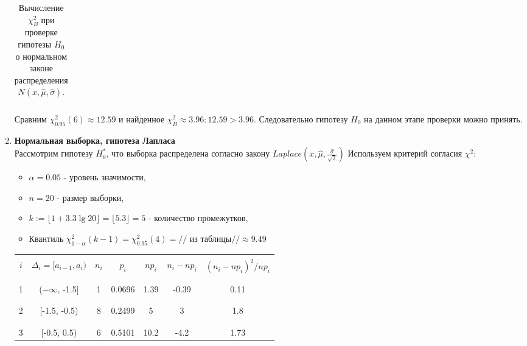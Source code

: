 \documentclass[../body.tex]{subfiles}
\begin{document}
\begin{enumerate}
\begin{table}[H]
\begin{tabular}{| c | c | c | c | c | c | c |}
			&  &  &  &  &  & \\\hline \hline
		\end{tabular}
		\caption{Вычисление $\chi_B^2$ при проверке гипотезы $H_0$ о нормальном законе распределения $N(x, \hat{\mu}, \hat{\sigma})$.}
		\label{chi2_normal}
	\end{table}
Сравним $\chi_{0.95}^2(6) \approx 12.59$ и найденное  $\chi_B^2 \approx 3.96: 12.59 > 3.96.$ Следовательно гипотезу $H_0$ на данном этапе проверки можно принять.\\
\item \textbf{Нормальная выборка, гипотеза Лапласа}\\
Рассмотрим гипотезу $H_0^*$, что выборка распределена согласно закону $Laplace(x, \hat{\mu},\frac{\hat{\sigma}}{\sqrt2} )$
Используем критерий согласия $\chi^2$:
\begin{itemize}
	\item $\alpha = 0.05$ - уровень значимости,
	\item $n = 20$ - размер выборки,
	\item $k := \lfloor1+3.3\lg 20\rfloor = \lfloor5.3\rfloor = 5$ - количество промежутков,
	\item Квантиль $\chi_{1 - \alpha}^2(k - 1) = \chi_{0.95}^2(4) = //$ из таблицы\cite[с.~358]{math}$// \approx 9.49$
\end{itemize}
\begin{table}[H]
	\centering
	\begin{tabular}{| c | c | c | c | c | c | c |}
		\hline \hline
		&  &  &  &  &  & \\
		$i$   & $\Delta_i = [a_{i-1}, a_i)$   &   $n_i$ &   $p_i$ &   $np_i$ &   $n_i - np_i$ &   $(n_i - np_i)^2/np_i$ \\
		&  &  &  &  &  & \\
		\hline
		&  &  &  &  &  & \\
		1     & ($-\infty$, -1.5]           &       1 &  0.0696 &     1.39 &          -0.39 &                    0.11 \\
		&  &  &  &  &  & \\\hline &  &  &  &  &  & \\
		2     & [-1.5, -0.5)                  &       8 &  0.2499 &     5    &           3    &                    1.8  \\
		&  &  &  &  &  & \\\hline &  &  &  &  &  & \\
		3     & [-0.5, 0.5)                   &       6 &  0.5101 &    10.2  &          -4.2  &                    1.73 \\

\end{tabular}
\end{table}
\end{enumerate}
\end{document}
